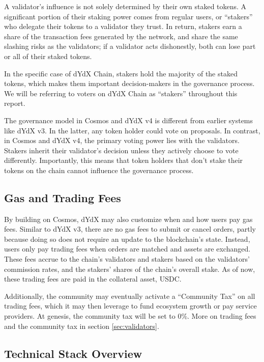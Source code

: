         A validator's influence is not solely determined by their own staked tokens. A significant portion of their staking power comes from regular users, or ``stakers'' who delegate their tokens to a validator they trust. In return, stakers earn a share of the transaction fees generated by the network, and share the same slashing risks as the validators; if a validator acts dishonestly, both can lose part or all of their staked tokens.
        
        In the specific case of dYdX Chain, stakers hold the majority of the staked tokens, which makes them important decision-makers in the governance process. We will be referring to voters on dYdX Chain as ``stakers'' throughout this report.
        
        The governance model in Cosmos and dYdX v4 is different from earlier systems like dYdX v3. In the latter, any token holder could vote on proposals. In contrast, in Cosmos and dYdX v4, the primary voting power lies with the validators. Stakers inherit their validator's decision unless they actively choose to vote differently. Importantly, this means that token holders that don't stake their tokens on the chain cannot influence the governance process.
        
    \subsection{Gas and Trading Fees}

        By building on Cosmos, dYdX may also customize when and how users pay gas fees. Similar to dYdX v3, there are no gas fees to submit or cancel orders, partly because doing so does not require an update to the blockchain's state. Instead, users only pay trading fees when orders are matched and assets are exchanged. These fees accrue to the chain's validators and stakers based on the validators' commission rates, and the stakers' shares of the chain's overall stake. As of now, these trading fees are paid in the collateral asset, USDC.
        
        Additionally, the community may eventually activate a ``Community Tax'' on all trading fees, which it may then leverage to fund ecosystem growth or pay service providers. At genesis, the community tax will be set to 0\%. More on trading fees and the community tax in section \ref{sec:validators}. 

    \subsection{Technical Stack Overview}


